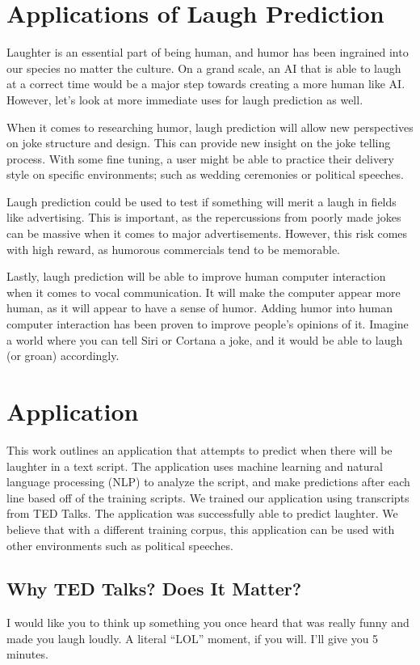 \section{Applications of Laugh Prediction}
Laughter is an essential part of being human, and humor has been ingrained into our species no matter the culture. On a grand scale, an AI that is able to laugh at a correct time would be a major step towards creating a more human like AI. However, let's look at more immediate uses for laugh prediction as well.

When it comes to researching humor, laugh prediction will allow new perspectives on joke structure and design. This can provide new insight on the joke telling process. With some fine tuning, a user might be able to practice their delivery style on specific environments; such as wedding ceremonies or political speeches. 

Laugh prediction could be used to test if something will merit a laugh in fields like advertising. This is important, as the repercussions from poorly made jokes can be massive when it comes to major advertisements. However, this risk comes with high reward, as humorous commercials tend to be memorable.

Lastly, laugh prediction will be able to improve human computer interaction when it comes to vocal communication. It will make the computer appear more human, as it will appear to have a sense of humor. Adding humor into human computer interaction has been proven to improve people's opinions of it.\cite{Teaching}\cite{Multi-Humoroid} Imagine a world where you can tell Siri or Cortana a joke, and it would be able to laugh (or groan) accordingly. 

\section{Application}
This work outlines an application that attempts to predict when there will be laughter in a text script. The application uses machine learning and natural language processing (NLP) to analyze the script, and make predictions after each line based off of the training scripts. We trained our application using transcripts from TED Talks. The application was successfully able to predict laughter. We believe that with a different training corpus, this application can be used with other environments such as political speeches.

\subsection{Why TED Talks? Does It Matter?}
I would like you to think up something you once heard that was really funny and made you laugh loudly. A literal ``LOL'' moment, if you will. I'll give you 5 minutes.


